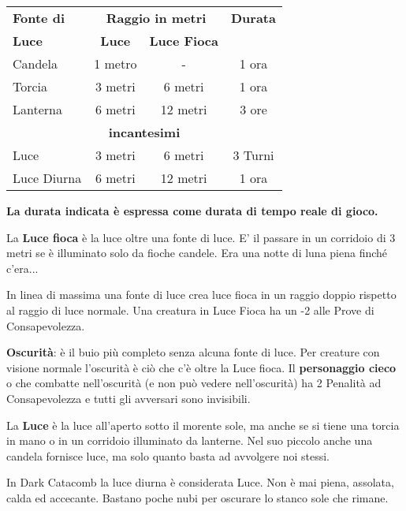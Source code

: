 \documentclass[12pt,a4paper,twoside,openany]{book}
\begin{document}
\begin{multicols}{2}
\begin{flushleft}
	\begin{tabular}{l|cc|c}
\textbf{Fonte di} &\multicolumn{2}{c}{\textbf{Raggio in metri}}& \textbf{Durata}  \\
\textbf{Luce}& \textbf{Luce} & \textbf{Luce Fioca} &\\
\toprule
Candela  & 1 metro & -  & 1 ora\\
Torcia & 3 metri & 6 metri  & 1 ora\\
Lanterna & 6 metri & 12 metri  & 3 ore \\
\multicolumn{4}{c}{\textbf{incantesimi}}\\
Luce  & 3 metri & 6 metri  &3 Turni \\
Luce Diurna  & 6 metri & 12 metri & 1 ora \\
\end{tabular}
\end{flushleft}

\textbf{La durata indicata è espressa come durata di tempo reale di gioco.}

\medskip

La \textbf{Luce fioca} è la luce oltre una fonte di luce. E' il passare in un corridoio di 3 metri se è illuminato solo da fioche candele. Era una notte di luna piena finché c'era...

In linea di massima una fonte di luce crea luce fioca in un raggio doppio rispetto al raggio di luce normale. Una creatura in Luce Fioca ha un -2 alle Prove di Consapevolezza.

\medskip

\textbf{Oscurità}: è il buio più completo senza alcuna fonte di luce. Per creature con visione normale l'oscurità è ciò che c'è oltre la Luce fioca.
Il \textbf{personaggio cieco} o che combatte nell'oscurità (e non può vedere nell'oscurità) ha 2 Penalità ad Consapevolezza e tutti gli avversari sono invisibili.

\medskip

La \textbf{Luce} è la luce all'aperto sotto il morente sole, ma anche se si tiene una torcia in mano o in un corridoio illuminato da lanterne. Nel suo piccolo anche una candela fornisce luce, ma solo quanto basta ad avvolgere noi stessi.


\begin{narratore}
In Dark Catacomb la luce diurna è considerata Luce. Non è mai piena, assolata, calda ed accecante. Bastano poche nubi per oscurare lo stanco sole che rimane.


\end{narratore}
\end{multicols}
\end{document}
